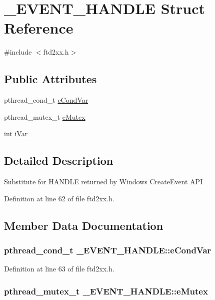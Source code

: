 \hypertarget{struct__EVENT__HANDLE}{
\section{\_\-EVENT\_\-HANDLE Struct Reference}
\label{struct__EVENT__HANDLE}
}


{\ttfamily \#include $<$ftd2xx.h$>$}\subsection*{Public Attributes}
\begin{DoxyCompactItemize}
\item 
pthread\_\-cond\_\-t \hyperlink{struct__EVENT__HANDLE_a22f9905a075b5f0c84fa336b8532e756}{eCondVar}
\item 
pthread\_\-mutex\_\-t \hyperlink{struct__EVENT__HANDLE_ac18c63dbb1acc29ff1104b80fe7b4269}{eMutex}
\item 
int \hyperlink{struct__EVENT__HANDLE_aa96bc22ec0f4f46df8e3ad9f1bbb7baa}{iVar}
\end{DoxyCompactItemize}


\subsection{Detailed Description}
Substitute for HANDLE returned by Windows CreateEvent API 

Definition at line 62 of file ftd2xx.h.

\subsection{Member Data Documentation}
\hypertarget{struct__EVENT__HANDLE_a22f9905a075b5f0c84fa336b8532e756}{
\subsubsection[{eCondVar}]{\setlength{\rightskip}{0pt plus 5cm}pthread\_\-cond\_\-t {\bf \_\-EVENT\_\-HANDLE::eCondVar}}}
\label{struct__EVENT__HANDLE_a22f9905a075b5f0c84fa336b8532e756}


Definition at line 63 of file ftd2xx.h.\hypertarget{struct__EVENT__HANDLE_ac18c63dbb1acc29ff1104b80fe7b4269}{
\subsubsection[{eMutex}]{\setlength{\rightskip}{0pt plus 5cm}pthread\_\-mutex\_\-t {\bf \_\-EVENT\_\-HANDLE::eMutex}}}
\label{struct__EVENT__HANDLE_ac18c63dbb1acc29ff1104b80fe7b4269}


